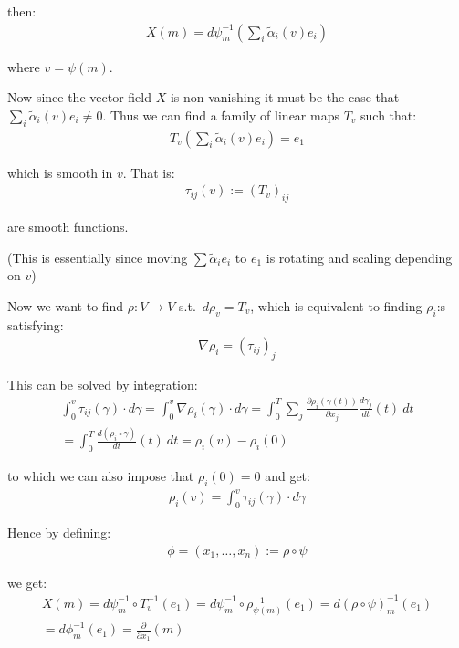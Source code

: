 				then:
				\begin{align*}
					X(m) = d \psi_m^{-1}\left(\sum_i \tilde{\alpha}_i(v) e_i \right)
				\end{align*}

				where $v = \psi(m)$. \bigskip

				Now since the vector field $X$ is non-vanishing it must be the case that $\sum_i \tilde{\alpha}_i(v) e_i \neq 0$. Thus we can find a family of linear maps $T_v$ such that:
				\begin{align*}
					T_v \left(\sum_i \tilde{\alpha}_i(v) e_i\right) = e_1
				\end{align*}

				which is smooth in $v$. That is:
				\begin{align*}
					\tau_{ij}(v) := (T_v)_{ij}
				\end{align*}

				are smooth functions. \bigskip

				(This is essentially since moving $\sum \tilde{\alpha}_i e_i$ to $e_1$ is rotating and scaling depending on $v$) \bigskip

				Now we want to find $\rho : V \to V$ s.t.\ $d \rho_v = T_v$, which is equivalent to finding $\rho_i$:s satisfying:
				\begin{align*}
					\nabla \rho_i = (\tau_{ij})_j
				\end{align*}

				This can be solved by integration:
				\begin{gather*}
					\int_{0}^{v} \tau_{ij}(\gamma) \cdot d \gamma = \int_{0}^{v} \nabla \rho_i(\gamma) \cdot d \gamma = \int_0^T \sum_j \frac{\partial \rho_i(\gamma(t))}{\partial x_j} \frac{d \gamma_j}{dt}(t) \: dt \\
					= \int_0^T \frac{d(\rho_i \circ \gamma)}{dt}(t) \: dt = \rho_i(v) - \rho_i(0)
				\end{gather*}

				to which we can also impose that $\rho_i(0) = 0$ and get:
				\begin{align*}
					\rho_i(v) = \int_{0}^{v} \tau_{ij}(\gamma) \cdot d \gamma
				\end{align*}

				Hence by defining:
				\begin{align*}
					\phi = (x_1, \ldots, x_n) := \rho \circ \psi
				\end{align*}

				we get:
				\begin{gather*}
					X(m) = d \psi_m^{-1} \circ T_v^{-1}(e_1) = d \psi_m^{-1} \circ \rho_{\psi(m)}^{-1}(e_1) = d(\rho \circ \psi)_m^{-1}(e_1) \\
					= d \phi^{-1}_m(e_1) = \frac{\partial}{\partial x_1}(m)
				\end{gather*}

